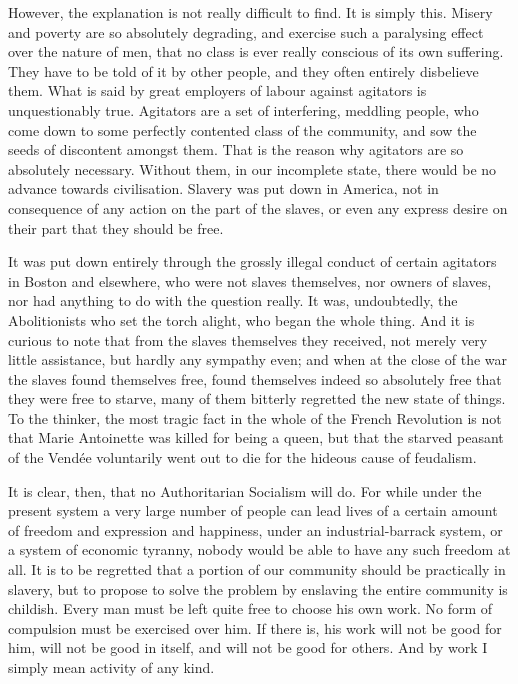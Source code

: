 However, the explanation is not really difficult to find. It is simply this. Misery and poverty are so absolutely degrading, and exercise such a paralysing effect over the nature of men, that no class is ever really conscious of its own suffering. They have to be told of it by other people, and they often entirely disbelieve them. What is said by great employers of labour against agitators is unquestionably true. Agitators are a set of interfering, meddling people, who come down to some perfectly contented class of the community, and sow the seeds of discontent amongst them. That is the reason why agitators are so absolutely necessary. Without them, in our incomplete state, there would be no advance towards civilisation. Slavery was put down in America, not in consequence of any action on the part of the slaves, or even any express desire on their part that they should be free.\par

It was put down entirely through the grossly illegal conduct of certain agitators in Boston and elsewhere, who were not slaves themselves, nor owners of slaves, nor had anything to do with the question really. It was, undoubtedly, the Abolitionists who set the torch alight, who began the whole thing. And it is curious to note that from the slaves themselves they received, not merely very little assistance, but hardly any sympathy even; and when at the close of the war the slaves found themselves free, found themselves indeed so absolutely free that they were free to starve, many of them bitterly regretted the new state of things. To the thinker, the most tragic fact in the whole of the French Revolution is not that Marie Antoinette was killed for being a queen, but that the starved peasant of the Vendée voluntarily went out to die for the hideous cause of feudalism.\par

It is clear, then, that no Authoritarian Socialism will do. For while under the present system a very large number of people can lead lives of a certain amount of freedom and expression and happiness, under an industrial-barrack system, or a system of economic tyranny, nobody would be able to have any such freedom at all. It is to be regretted that a portion of our community should be practically in slavery, but to propose to solve the problem by enslaving the entire community is childish. Every man must be left quite free to choose his own work. No form of compulsion must be exercised over him. If there is, his work will not be good for him, will not be good in itself, and will not be good for others. And by work I simply mean activity of any kind.\par


